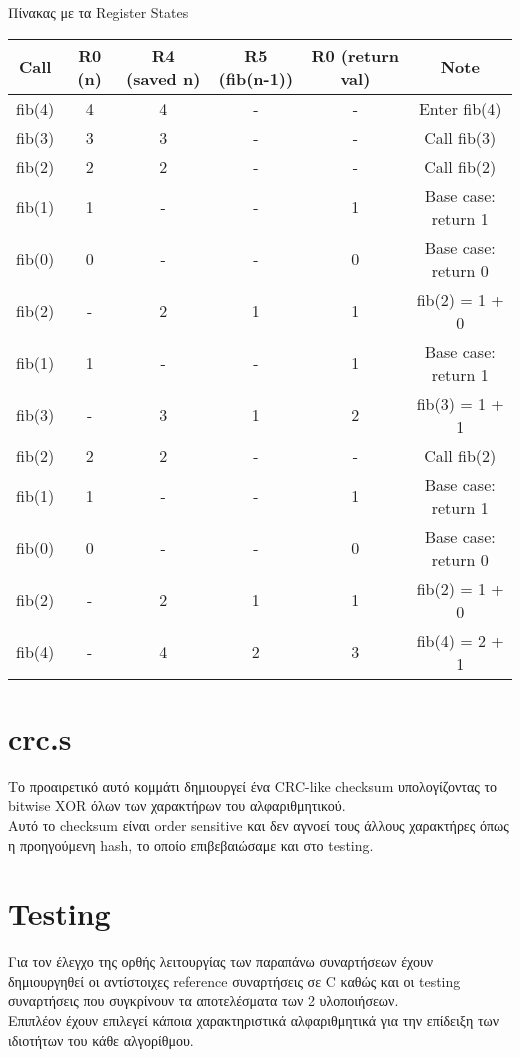 \documentclass{article}
\begin{document}
Πίνακας με τα Register States \\
\begin{center}
    \begin{tabular}{|c|c|c|c|c|c|} 
        \hline
        Call & R0 (n) & R4 (saved n) & R5 (fib(n-1)) & R0 (return val) & Note \\
        \hline
        fib(4) & 4 & 4 & - & - & Enter fib(4) \\
        fib(3) & 3 & 3 & - & - & Call fib(3) \\
        fib(2) & 2 & 2 & - & - & Call fib(2) \\
        fib(1) & 1 & - & - & 1 & Base case: return 1 \\
        fib(0) & 0 & - & - & 0 & Base case: return 0 \\
        fib(2) & - & 2 & 1 & 1 & fib(2) = 1 + 0 \\
        fib(1) & 1 & - & - & 1 & Base case: return 1 \\
        fib(3) & - & 3 & 1 & 2 & fib(3) = 1 + 1 \\
        fib(2) & 2 & 2 & - & - & Call fib(2) \\
        fib(1) & 1 & - & - & 1 & Base case: return 1 \\
        fib(0) & 0 & - & - & 0 & Base case: return 0 \\
        fib(2) & - & 2 & 1 & 1 & fib(2) = 1 + 0 \\
        fib(4) & - & 4 & 2 & 3 & fib(4) = 2 + 1 \\
        \hline
    \end{tabular} 
\end{center}


\section{crc.s}
Το προαιρετικό αυτό κομμάτι δημιουργεί ένα CRC-like checksum υπολογίζοντας το bitwise XOR όλων των χαρακτήρων του αλφαριθμητικού. \\
Αυτό το checksum είναι order sensitive και δεν αγνοεί τους άλλους χαρακτήρες όπως η προηγούμενη hash, το οποίο επιβεβαιώσαμε και στο testing. \\

\section{Testing}
Για τον έλεγχο της ορθής λειτουργίας των παραπάνω συναρτήσεων έχουν δημιουργηθεί οι αντίστοιχες reference συναρτήσεις σε C καθώς και οι testing συναρτήσεις που συγκρίνουν τα αποτελέσματα των 2 υλοποιήσεων. \\
Επιπλέον έχουν επιλεγεί κάποια χαρακτηριστικά αλφαριθμητικά για την επίδειξη των ιδιοτήτων του κάθε αλγορίθμου. \\
\end{document}
